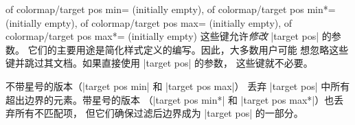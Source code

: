 {\begin{enumerate}
        \begin{pgfplotskeylist}{%
            of colormap/target pos min= (initially empty),
            of colormap/target pos min*= (initially empty),
            of colormap/target pos max= (initially empty),
            of colormap/target pos max*= (initially empty)%
        }
            这些键允许\emph{修改} |target pos| 的参数。
            它们的主要用途是简化样式定义的编写。因此，大多数用户可能
            想忽略这些键并跳过其文档。如果直接使用 |target pos| 的参数，
            这些键就不必要。

            不带星号的版本（|target pos min| 和 |target pos max|）
            丢弃 |target pos| 中所有超出边界的元素。带星号的版本
            （|target pos min*| 和 |target pos max*|）也丢弃所有不匹配项，
            但它们确保过滤后边界成为 |target pos| 的一部分。


\end{pgfplotskeylist}
\end{enumerate}}
